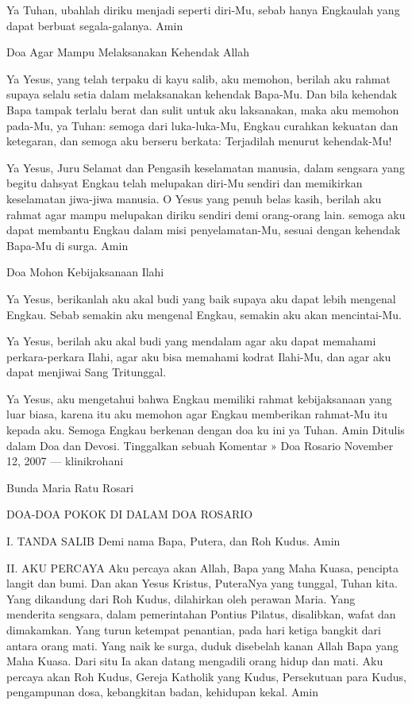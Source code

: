 \documentclass[a5paper,headsepline,titlepage,11pt,nnormalheadings,DIVcalc]{scrbook}
\begin{document}
Ya Tuhan, ubahlah diriku menjadi seperti diri-Mu, sebab hanya Engkaulah yang dapat berbuat segala-galanya. Amin

Doa Agar Mampu Melaksanakan Kehendak Allah

Ya Yesus, yang telah terpaku di kayu salib, aku memohon, berilah aku rahmat supaya selalu setia dalam melaksanakan kehendak Bapa-Mu. Dan bila kehendak Bapa tampak terlalu berat dan sulit untuk aku laksanakan, maka aku memohon pada-Mu, ya Tuhan: semoga dari luka-luka-Mu, Engkau curahkan kekuatan dan ketegaran, dan semoga aku berseru berkata: Terjadilah menurut kehendak-Mu!

Ya Yesus, Juru Selamat dan Pengasih keselamatan manusia, dalam sengsara yang begitu dahsyat Engkau telah melupakan diri-Mu sendiri dan memikirkan keselamatan jiwa-jiwa manusia. O Yesus yang penuh belas kasih, berilah aku rahmat agar mampu melupakan diriku sendiri demi orang-orang lain. semoga aku dapat membantu Engkau dalam misi penyelamatan-Mu, sesuai dengan kehendak Bapa-Mu di surga. Amin

Doa Mohon Kebijaksanaan Ilahi

Ya Yesus, berikanlah aku akal budi yang baik supaya aku dapat lebih mengenal Engkau. Sebab semakin aku mengenal Engkau, semakin aku akan mencintai-Mu.

Ya Yesus, berilah aku akal budi yang mendalam agar aku dapat memahami perkara-perkara Ilahi, agar aku bisa memahami kodrat Ilahi-Mu, dan agar aku dapat menjiwai Sang Tritunggal.

Ya Yesus, aku mengetahui bahwa Engkau memiliki rahmat kebijaksanaan yang luar biasa, karena itu aku memohon agar Engkau memberikan rahmat-Mu itu kepada aku. Semoga Engkau berkenan dengan doa ku ini ya Tuhan. Amin
Ditulis dalam Doa dan Devosi. Tinggalkan sebuah Komentar »
Doa Rosario
November 12, 2007 — klinikrohani


Bunda Maria Ratu Rosari

DOA-DOA POKOK DI DALAM DOA ROSARIO

I. TANDA SALIB
Demi nama Bapa, Putera, dan Roh Kudus. Amin

II. AKU PERCAYA
Aku percaya akan Allah, Bapa yang Maha Kuasa, pencipta langit dan bumi. Dan akan Yesus Kristus, PuteraNya yang tunggal, Tuhan kita. Yang dikandung dari Roh Kudus, dilahirkan oleh perawan Maria. Yang menderita sengsara, dalam pemerintahan Pontius Pilatus, disalibkan, wafat dan dimakamkan. Yang turun ketempat penantian, pada hari ketiga bangkit dari antara orang mati. Yang naik ke surga, duduk disebelah kanan Allah Bapa yang Maha Kuasa. Dari situ Ia akan datang mengadili orang hidup dan mati. Aku percaya akan Roh Kudus, Gereja Katholik yang Kudus, Persekutuan para Kudus, pengampunan dosa, kebangkitan badan, kehidupan kekal. Amin
\end{document}
